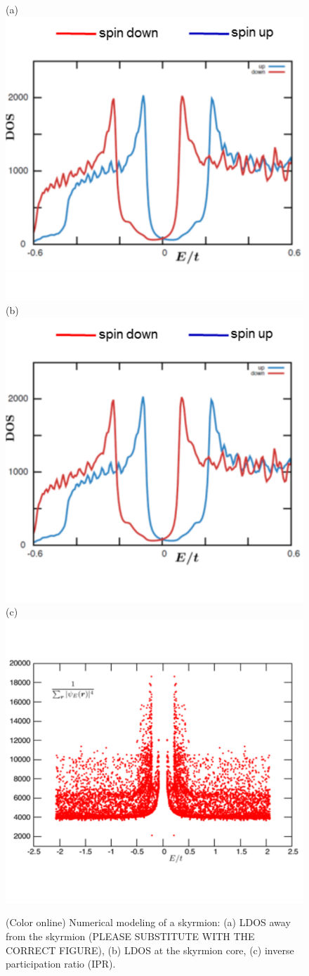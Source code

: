 \documentclass[twocolumn,showpacs,floatfix,nofootinbib,longbibliography]{revtex4-1}
\begin{document}
\begin{figure} \centering
	(a)\includegraphics[width=0.25\linewidth]{numerical-LDOS-away} \hspace{0.1cm}
	(b)\includegraphics[width=0.25\linewidth]{numerical-LDOS-core} \hspace{0.1cm}
	(c)\includegraphics[width=0.25\linewidth]{numerical-IPR}
\caption{(Color online) Numerical modeling of a skyrmion: (a) LDOS away from the skyrmion (PLEASE SUBSTITUTE WITH THE CORRECT FIGURE), (b) LDOS at the skyrmion core, (c) inverse participation ratio (IPR).} \label{fig:LDOSNumerics}
\end{figure}

\end{document}
